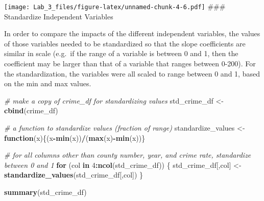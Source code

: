 \documentclass[]{article}
\newenvironment{Shaded}{\begin{snugshade}}{\end{snugshade}}
\newcommand{\KeywordTok}[1]{\textcolor[rgb]{0.13,0.29,0.53}{\textbf{#1}}}
\newcommand{\DecValTok}[1]{\textcolor[rgb]{0.00,0.00,0.81}{#1}}
\newcommand{\StringTok}[1]{\textcolor[rgb]{0.31,0.60,0.02}{#1}}
\newcommand{\CommentTok}[1]{\textcolor[rgb]{0.56,0.35,0.01}{\textit{#1}}}
\newcommand{\ControlFlowTok}[1]{\textcolor[rgb]{0.13,0.29,0.53}{\textbf{#1}}}
\newcommand{\OperatorTok}[1]{\textcolor[rgb]{0.81,0.36,0.00}{\textbf{#1}}}
\newcommand{\NormalTok}[1]{#1}
\begin{document}
\texttt{[image: Lab\_3\_files/figure-latex/unnamed-chunk-4-6.pdf]} \#\#\#
Standardize Independent Variables

In order to compare the impacts of the different independent variables,
the values of those variables needed to be standardized so that the
slope coefficients are similar in scale (e.g.~if the range of a variable
is between 0 and 1, then the coefficient may be larger than that of a
variable that ranges between 0-200). For the standardization, the
variables were all scaled to range between 0 and 1, based on the min and
max values.

\begin{Shaded}
\begin{Highlighting}[]
\CommentTok{# make a copy of crime_df for standardizing values}
\NormalTok{std_crime_df <-}\StringTok{ }\KeywordTok{cbind}\NormalTok{(crime_df)}

\CommentTok{# a function to standardize values (fraction of range)}
\NormalTok{standardize_values <-}\StringTok{ }\ControlFlowTok{function}\NormalTok{(x)\{(x}\OperatorTok{-}\KeywordTok{min}\NormalTok{(x))}\OperatorTok{/}\NormalTok{(}\KeywordTok{max}\NormalTok{(x)}\OperatorTok{-}\KeywordTok{min}\NormalTok{(x))\}}

\CommentTok{# for all columns other than county number, year, and crime rate, standardize between 0 and 1}
\ControlFlowTok{for}\NormalTok{ (col }\ControlFlowTok{in} \DecValTok{4}\OperatorTok{:}\KeywordTok{ncol}\NormalTok{(std_crime_df)) \{}
\NormalTok{  std_crime_df[,col] <-}\StringTok{ }\KeywordTok{standardize_values}\NormalTok{(std_crime_df[,col])}
\NormalTok{\}}

\KeywordTok{summary}\NormalTok{(std_crime_df)}
\end{Highlighting}
\end{Shaded}
\end{document}
